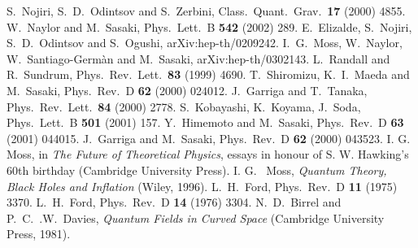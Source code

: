 \documentclass[a4paper,a4paper]{article}
\begin{document}
\begin{thebibliography}{99}

 S.~Nojiri, S.~D.~Odintsov and S.~Zerbini,
Class.\ Quant.\ Grav.\ {\bf 17} (2000) 4855.
 W.~Naylor and M.~Sasaki, Phys.\ Lett.\ B {\bf 542} (2002) 289.
 E.~Elizalde, S.~Nojiri, S.~D.~Odintsov and S.~Ogushi, 
arXiv:hep-th/0209242.
 I.~G.~Moss, W.~Naylor, W.~Santiago-Germ\`{a}n and  M.~Sasaki, 
arXiv:hep-th/0302143.
 L.~Randall and R.~Sundrum,
 Phys.\ Rev.\ Lett.\ {\bf 83} (1999) 4690.
 T.~Shiromizu, K.~I.~Maeda and M.~Sasaki, Phys.\ Rev.\ D
{\bf 62} (2000) 024012.
J.~Garriga and T.~Tanaka,
 Phys.\ Rev.\ Lett.\ {\bf 84} (2000) 2778.
 S.~Kobayashi, K.~Koyama, J.~Soda, Phys.\ Lett.\ B {\bf 501} 
(2001) 157.
 Y.~Himemoto and M.~Sasaki, Phys.\ Rev.\ D {\bf 63} (2001) 044015.
 J.~Garriga and M.~Sasaki, Phys.\ Rev.\ D {\bf 62} (2000) 043523.
 I. G. Moss, in {\it The Future of Theoretical Physics}, essays in 
honour of S. W. Hawking's 60th birthday (Cambridge University Press).
 I. G. ~Moss, {\it Quantum Theory, Black Holes and Inflation} 
(Wiley, 1996).
 L.~H.~Ford, Phys.\ Rev.\ D {\bf 11} (1975) 3370.
 L.~H.~Ford, Phys.\ Rev.\ D {\bf 14} (1976) 3304.
 N.~D.~Birrel and P.~C.~.W.~Davies, {\it Quantum Fields in Curved 
Space} (Cambridge University Press, 1981).

\end{thebibliography}
\end{document}
